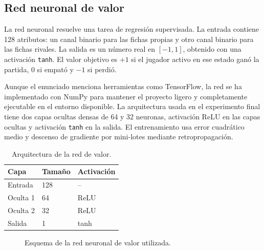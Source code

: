 \documentclass[conference,a4paper]{IEEEtran}
\begin{document}
\subsection{Red neuronal de valor}

La red neuronal resuelve una tarea de regresión supervisada. La entrada contiene
128 atributos: un canal binario para las fichas propias y otro canal binario
para las fichas rivales. La salida es un número real en \([-1, 1]\), obtenido con
una activación \texttt{tanh}. El valor objetivo es \(+1\) si el jugador activo en
ese estado ganó la partida, \(0\) si empató y \(-1\) si perdió.

Aunque el enunciado menciona herramientas como TensorFlow, la red se ha
implementado con NumPy para mantener el proyecto ligero y completamente
ejecutable en el entorno disponible. La arquitectura usada en el experimento
final tiene dos capas ocultas densas de 64 y 32 neuronas, activación ReLU en las
capas ocultas y activación \texttt{tanh} en la salida. El entrenamiento usa error
cuadrático medio y descenso de gradiente por mini-lotes mediante
retropropagación.

\begin{table}[h]
\centering
\caption{Arquitectura de la red de valor.}
\label{tab:red}
\begin{tabular}{lll}
\toprule
Capa & Tamaño & Activación \\
\midrule
Entrada & 128 & -- \\
Oculta 1 & 64 & ReLU \\
Oculta 2 & 32 & ReLU \\
Salida & 1 & tanh \\
\bottomrule
\end{tabular}
\end{table}

\begin{figure}[t]
\centering
{}
\caption{Esquema de la red neuronal de valor utilizada.}
\label{fig:red-valor}
\end{figure}
\end{document}
